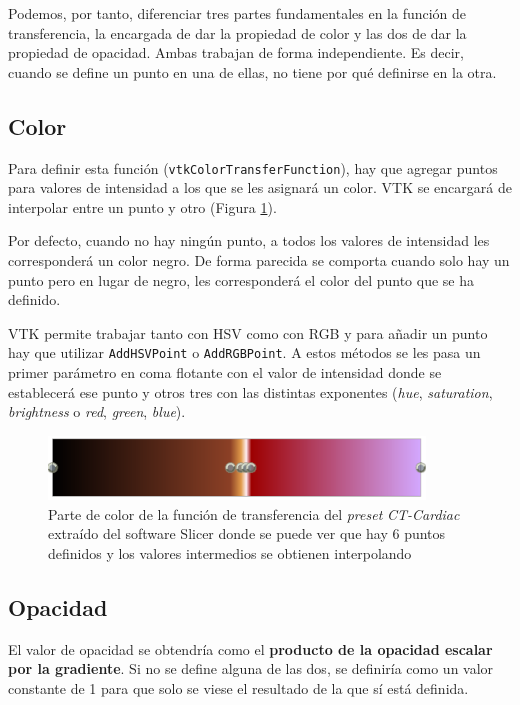 Podemos, por tanto, diferenciar tres partes fundamentales en la función de transferencia, la encargada de dar la propiedad de color y las dos de dar la propiedad de opacidad. Ambas trabajan de forma independiente. Es decir, cuando se define un punto en una de ellas, no tiene por qué definirse en la otra.

\subsection{Color}

Para definir esta función (\texttt{vtkColorTransferFunction}), hay que agregar puntos para valores de intensidad a los que se les asignará un color. VTK se encargará de interpolar entre un punto y otro (Figura \ref{fig:color_tf}). 

Por defecto, cuando no hay ningún punto, a todos los valores de intensidad les corresponderá un color negro. De forma parecida se comporta cuando solo hay un punto pero en lugar de negro, les corresponderá el color del punto que se ha definido.

VTK permite trabajar tanto con HSV como con RGB y para añadir un punto hay que utilizar \texttt{AddHSVPoint} o \texttt{AddRGBPoint}. A estos métodos se les pasa un primer parámetro en coma flotante con el valor de intensidad donde se establecerá ese punto y otros tres con las distintas exponentes (\textit{hue}, \textit{saturation}, \textit{brightness} o \textit{red}, \textit{green}, \textit{blue}).

\begin{figure}[H]
	\centering
	\includegraphics[width=10cm]{imagenes/color_tf}
	\caption{Parte de color de la función de transferencia del \textit{preset} \textit{CT-Cardiac} extraído del software Slicer \cite{slicer} donde se puede ver que hay 6 puntos definidos y los valores intermedios se obtienen interpolando}
	\label{fig:color_tf}
\end{figure}

\subsection{Opacidad}

El valor de opacidad se obtendría como el \textbf{producto de la opacidad escalar por la gradiente}. Si no se define alguna de las dos, se definiría como un valor constante de 1 para que solo se viese el resultado de la que sí está definida.

